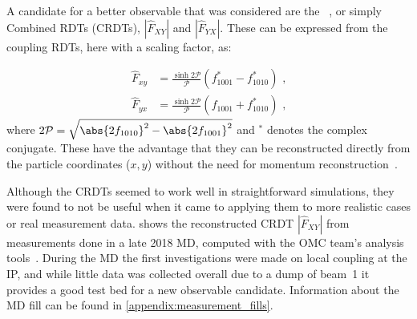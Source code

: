 A candidate for a better observable that was considered are the ~\cite{PRAB:Franchi:First_Simultaneous}, or simply Combined RDTs (CRDTs), \(|\hat{F}_{XY}|\) and \(|\hat{F}_{YX}|\).
These can be expressed from the coupling RDTs, here with a scaling factor, as:

\begin{equation}
    \begin{aligned}
        \hat{F}_{xy} &= \frac{\sinh{2 \mathcal{P}}}{\mathcal{P}} \left( f^{\ast}_{1001} - f^{\ast}_{1010} \right)  \text{ ,} \\
        \hat{F}_{yx} &= \frac{\sinh{2 \mathcal{P}}}{\mathcal{P}} \left( f_{1001} + f^{\ast}_{1010} \right)         \text{ ,}
    \end{aligned}
    \label{equation:combined_coupling_rdts}
\end{equation}
where \(2 \mathcal{P} = \sqrt{\abs{2 f_{1010}}^2 - \abs{2 f_{1001}}^2}\) and \(^{\ast}\) denotes the complex conjugate.
These have the advantage that they can be reconstructed directly from the particle coordinates (\(x,y\)) without the need for momentum reconstruction~\cite{PRAB:Hofer:Coupling_Local_Observables}.
\newline

Although the CRDTs seemed to work well in straightforward simulations, they were found to not be useful when it came to applying them to more realistic cases or real measurement data.
 shows the reconstructed CRDT \(|\hat{F}_{XY}|\) from measurements done in a late \num{2018} MD, computed with the OMC team's analysis tools~\cite{CODE:OMC:omc3}.
During the MD the first investigations were made on local coupling at the IP, and while little data was collected overall due to a dump of beam~\num{1} it provides a good test bed for a new observable candidate.
Information about the MD fill can be found in \cref{appendix:measurement_fills}.

